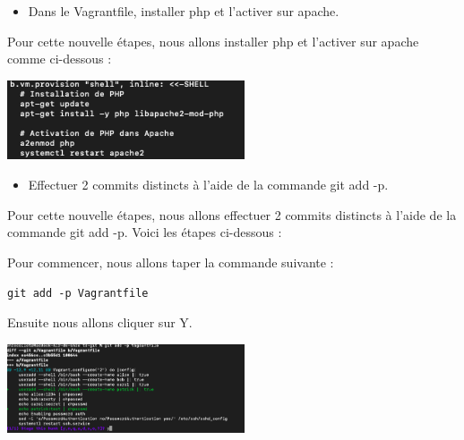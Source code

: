 \documentclass[12pt]{article}
\begin{document}
\vspace{0.3cm}

\begin{itemize}
  \item Dans le Vagrantfile, installer php et l'activer sur apache.
\end{itemize}

\vspace{0.3cm}

Pour cette nouvelle étapes, nous allons installer php et l'activer sur apache comme ci-dessous : 

\vspace{0.3cm}

\begin{center}
  \includegraphics[width=7cm]{Image-TD-Git-2/php-apache.png}
\end{center}

\vspace{0.3cm}

\begin{itemize}
  \item Effectuer 2 commits distincts à l'aide de la commande git add -p.
\end{itemize}

\vspace{0.3cm}

Pour cette nouvelle étapes, nous allons effectuer 2 commits distincts à l'aide de la commande git add -p. Voici les étapes ci-dessous : 

\vspace{0.3cm}

Pour commencer, nous allons taper la commande suivante : 

\texttt{git add -p Vagrantfile}

\vspace{0.3cm}

Ensuite nous allons cliquer sur Y. 

\vspace{0.3cm}

\begin{center}
  \includegraphics[width=7cm]{Image-TD-Git-2/git-add-1.png}
\end{center}
\end{document}
